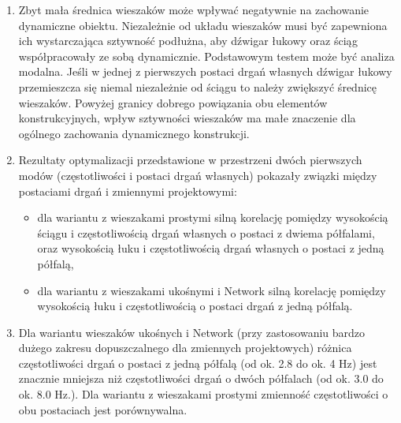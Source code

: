\begin{enumerate}
\item Zbyt mała średnica wieszaków może wpływać negatywnie na zachowanie dynamiczne obiektu. Niezależnie od układu wieszaków musi być zapewniona ich wystarczająca sztywność podłużna, aby dźwigar łukowy oraz ściąg współpracowały ze sobą dynamicznie. Podstawowym testem może być analiza modalna. Jeśli w jednej z pierwszych postaci drgań własnych dźwigar łukowy przemieszcza się niemal niezależnie od ściągu to należy zwiększyć średnicę wieszaków. Powyżej granicy dobrego powiązania obu elementów konstrukcyjnych, wpływ sztywności wieszaków ma małe znaczenie dla ogólnego zachowania dynamicznego konstrukcji.

\item Rezultaty optymalizacji przedstawione w przestrzeni dwóch pierwszych modów (częstotliwości i postaci drgań własnych) pokazały związki między postaciami drgań i zmiennymi projektowymi:
\begin{itemize} 
	\item dla wariantu z wieszakami prostymi silną korelację pomiędzy wysokością ściągu i częstotliwością drgań własnych o postaci z dwiema półfalami, oraz wysokością łuku i częstotliwością drgań własnych o postaci z jedną półfalą,
	\item dla wariantu z wieszakami ukośnymi i Network silną korelację pomiędzy wysokością łuku i częstotliwością o postaci drgań z jedną półfalą.
\end{itemize}

\item Dla wariantu wieszaków ukośnych i Network (przy zastosowaniu bardzo dużego zakresu dopuszczalnego dla zmiennych projektowych) różnica częstotliwości drgań o postaci z jedną półfalą (od ok. 2.8 do ok. 4 Hz) jest znacznie mniejsza niż częstotliwości drgań o dwóch półfalach (od ok. 3.0 do ok. 8.0 Hz.). Dla wariantu z wieszakami prostymi zmienność częstotliwości o obu postaciach jest porównywalna.


\end{enumerate}
